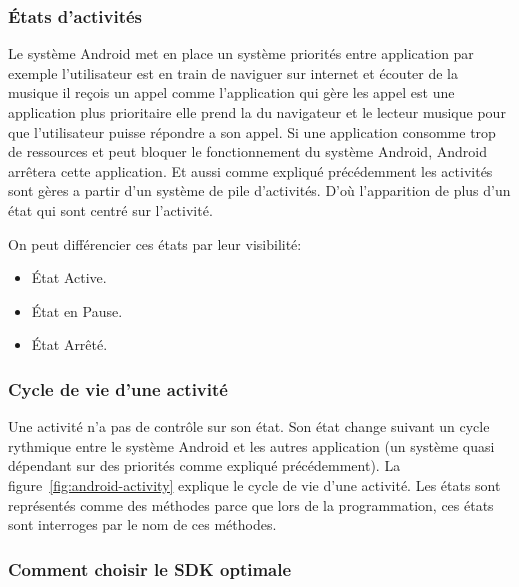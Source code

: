 \subsubsection{États d'activités}

Le système Android met en place un système priorités entre application par
exemple l'utilisateur est en train de naviguer sur internet et écouter de la
musique il reçois un appel comme l'application qui gère les appel est une
application plus prioritaire elle prend la du navigateur et le lecteur musique
pour que l'utilisateur puisse répondre a son appel. Si une application consomme
trop de ressources et peut bloquer le fonctionnement du système Android,
Android arrêtera cette application. Et aussi comme expliqué précédemment les
activités sont gères a partir d'un système de pile d'activités. D'où
l'apparition de plus d'un état qui sont centré sur l'activité.

On peut différencier ces états par leur visibilité:

\begin{itemize}
    \item État Active.
    \item État en Pause.
    \item État Arrêté.
\end{itemize}

\subsubsection{Cycle de vie d'une activité}

Une activité n'a pas de contrôle sur son état. Son état change suivant un cycle
rythmique entre le système Android et les autres application (un système quasi
dépendant sur des priorités comme expliqué précédemment). La
figure~\ref{fig:android-activity} explique le cycle de vie d'une activité. Les
états sont représentés comme des méthodes parce que lors de la programmation,
ces états sont interroges par le nom de ces méthodes.



\subsubsection{Comment choisir le SDK optimale}


